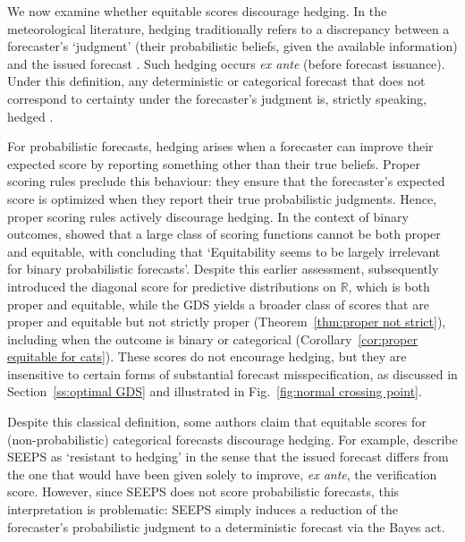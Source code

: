\documentclass[10pt]{article} %
\theoremstyle{theorem}
\theoremstyle{definition}
\newcommand{\RRR}{\mathbb{R}}
\begin{document}
We now examine whether equitable scores discourage hedging. In the meteorological literature, hedging traditionally refers to a discrepancy between a forecaster’s `judgment' (their probabilistic beliefs, given the available information) and the issued forecast \citep{winkler1968good, murphy1978hedging}. Such hedging occurs \textit{ex ante} (before forecast issuance). Under this definition, any deterministic or categorical forecast that does not correspond to certainty under the forecaster’s judgment is, strictly speaking, hedged \citep{murphy1967note, murphy1978hedging}.

For probabilistic forecasts, hedging arises when a forecaster can improve their expected score by reporting something other than their true beliefs. Proper scoring rules preclude this behaviour: they ensure that the forecaster's expected score is optimized when they report their true probabilistic judgments. Hence, proper scoring rules actively discourage hedging. In the context of binary outcomes, \citet{jolliffe2008proper} showed that a large class of scoring functions cannot be both proper and equitable, with \citet{jolliffe2008impenetrable} concluding that `Equitability seems to be largely irrelevant for binary probabilistic forecasts'. Despite this earlier assessment, \citet{ben2018diagonal} subsequently introduced the diagonal score for predictive distributions on $\RRR$, which is both proper and equitable, while the GDS yields a broader class of scores that are proper and equitable but not strictly proper (Theorem~\ref{thm:proper not strict}), including when the outcome is binary or categorical (Corollary~\ref{cor:proper equitable for cats}). These scores do not encourage hedging, but they are insensitive to certain forms of substantial forecast misspecification, as discussed in Section~\ref{ss:optimal GDS} and illustrated in Fig.~\ref{fig:normal crossing point}.

Despite this classical definition, some authors claim that equitable scores for (non-probabilistic) categorical forecasts discourage hedging. For example, \citet{north2013assessment} describe SEEPS as `resistant to hedging' in the sense that the issued forecast differs from the one that would have been given solely to improve, \textit{ex ante}, the verification score. However, since SEEPS does not score probabilistic forecasts, this interpretation is problematic: SEEPS simply induces a reduction of the forecaster’s probabilistic judgment to a deterministic forecast via the Bayes act.
\end{document}
